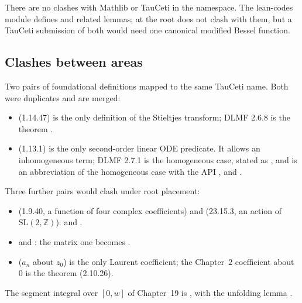 \documentclass[11pt,a4paper]{article}
\begin{document}
There are no clashes with Mathlib or TauCeti in the  namespace. The lean-codes
module  defines 
and related lemmas;  at the root does not clash with them, but a
TauCeti submission of both would need one canonical modified Bessel function.

\subsection{Clashes between areas}

Two pairs of foundational definitions mapped to the same TauCeti name. Both were duplicates
and are merged:
\begin{itemize}
  \item {} (1.14.47) is the only definition of the
    Stieltjes transform; DLMF 2.6.8 is the theorem
    .
  \item {} (1.13.1) is the only second-order
    linear ODE predicate. It allows an inhomogeneous term; DLMF 2.7.1 is the homogeneous case,
    stated as ,
    and  is an abbreviation of the homogeneous case with the API
    ,  and .
\end{itemize}
Three further pairs would clash under root placement:
\begin{itemize}
  \item {} (1.9.40, a function of four complex
    coefficients) and  (23.15.3, an action of
    $\mathrm{SL}(2,\mathbb Z)$):  and .
  \item {} and :
    the matrix one becomes .
  \item {} ($a_n$ about $z_0$) is the only Laurent
    coefficient; the Chapter~2 coefficient about $0$ is the theorem
     (2.10.26).
\end{itemize}
The segment integral over $[0,w]$ of Chapter~19 is , with the unfolding
lemma .
\end{document}
